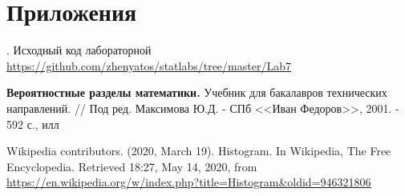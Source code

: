 \documentclass[12pt,a4paper]{article}
\begin{document}
\section{Приложения}\label{sec:appl}
. Исходный код лабораторной {\url{https://github.com/zhenyatos/statlabs/tree/master/Lab7}}

\begin{thebibliography}{9} 
	 \textbf{Вероятностные разделы математики.} Учебник для бакалавров технических направлений. // Под ред. Максимова Ю.Д. - СПб <<Иван Федоров>>, 2001. - 592 с., илл
	
	 Wikipedia contributors. (2020, March 19). Histogram. In Wikipedia, The Free Encyclopedia. Retrieved 18:27, May 14, 2020, from \url{https://en.wikipedia.org/w/index.php?title=Histogram&oldid=946321806}
\end{thebibliography}
\end{document}
